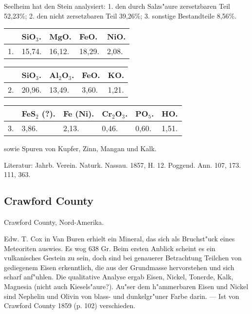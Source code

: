 \documentclass[a4paper, 11pt, oneside]{article}
\begin{document}
Seelheim hat den Stein analysiert: 1. den durch Salzs"aure zersetzbaren Teil 52,23\%; 2. den nicht zersetzbaren Teil 39,26\%; 3. sonstige Bestandteile 8,56\%.
\begin{table}[H]
    \centering
    \begin{tabular}{l l l l l}
        ~ & SiO$_{3}$. & MgO. & FeO. & NiO. \\ \hline
        1. & 15,74. & 16,12. & 18,29. & 2,08. \\
    \end{tabular}
\end{table}

\begin{table}[H]
    \centering
    \begin{tabular}{l l l l l}
        ~ & SiO$_{3}$. & Al$_{2}$O$_{3}$. & FeO. & KO. \\ \hline
        2. & 20,96. & 13,49. & 3,60. & 1,21. \\
    \end{tabular}
\end{table}

\begin{table}[H]
    \centering
    \begin{tabular}{l l l l l l}
        ~ & FeS$_{2}$ (?). & Fe (Ni). & Cr$_{2}$O$_{3}$. & PO$_{5}$. & HO. \\ \hline
        3. & 3,86. & 2,13. & 0,46. & 0,60. & 1,51. \\
    \end{tabular}
\end{table}

sowie Spuren von Kupfer, Zinn, Mangan und Kalk.

\footnotesize
Literatur: Jahrb. Verein. Naturk. Nassau. 1857, H. 12. Poggend. Ann. 107, 173. 111, 363.

\subsection{Crawford County}
\normalsize
\paragraph{}
Crawford County, Nord-Amerika.

Edw. T. Cox in Van Buren erhielt ein Mineral, das sich als Bruchst"uck eines Meteoriten auswies. Es wog 638 Gr. Beim ersten Anblick scheint es ein vulkanisches Gestein zu sein, doch sind bei genauerer Betrachtung Teilchen von gediegenem Eisen erkenntlich, die aus der Grundmasse hervorstehen und sich scharf anf"uhlen. Die qualitative Analyse ergab Eisen, Nickel, Tonerde, Kalk, Magnesia (nicht auch Kiesels"aure?). Au"ser dem h"ammerbaren Eisen und Nickel sind Nephelin und Olivin von blass- und dunkelgr"uner Farbe darin. --- Ist von Crawford County 1859 (p. 102) verschieden.
\end{document}
